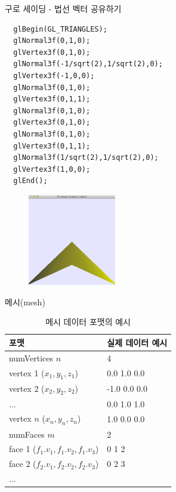 \documentclass{beamer}
\begin{document}
\begin{frame}[fragile]{구로 세이딩 - 법선 벡터 공유하기}

\lstset{language=C++, escapechar=^} 
\begin{lstlisting}
  glBegin(GL_TRIANGLES);
  glNormal3f(0,1,0);  
  glVertex3f(0,1,0);
  glNormal3f(-1/sqrt(2),1/sqrt(2),0);  
  glVertex3f(-1,0,0);
  glNormal3f(0,1,0);  
  glVertex3f(0,1,1);
  glNormal3f(0,1,0);  
  glVertex3f(0,1,0);
  glNormal3f(0,1,0);  
  glVertex3f(0,1,1);
  glNormal3f(1/sqrt(2),1/sqrt(2),0);  
  glVertex3f(1,0,0);
  glEnd();
\end{lstlisting}

\begin{figure}[h!]
  \centering
    \includegraphics[height=4.0cm]{OGL_light/twoFacesFourNormals.png}
\end{figure}

\end{frame}


\begin{frame}[fragile]{메시(mesh)}

\begin{table}
\caption{메시 데이터 포맷의 예시}
\label{tab:meshDataExample}
\begin{center}
    \begin{tabular}{ |l|l|}
    \hline
    {\small \sf 포맷} & {\small \sf 실제 데이터 예시} \\ \hline
numVertices $n$  & 4\\ 
vertex 1 ($x_1,y_1,z_1$) & 0.0 1.0  0.0\\ 
vertex 2 ($x_2,y_2,z_2$) & -1.0  0.0  0.0\\ 
... &  0.0  1.0  1.0\\ 
vertex $n$ ($x_n,y_n,z_n$) & 1.0  0.0  0.0\\ 
numFaces $m$ & 2\\ 
face 1 ($f_1.v_1,f_1.v_2,f_1.v_3$) &  0 1 2\\
face 2 ($f_2.v_1,f_2.v_2,f_2.v_3$) & 0 2 3\\
 ... & \\ 
\hline
\end{tabular}
\end{center}
\end{table}

\end{frame}
\end{document}
